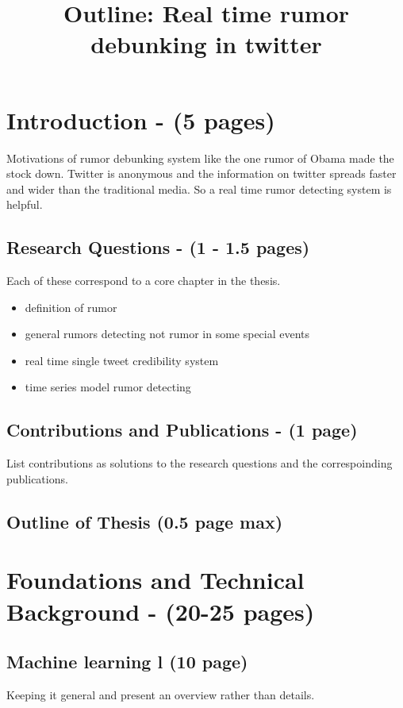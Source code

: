 \documentclass[12pt]{article}
\begin{document}
\title{Outline: Real time rumor debunking in twitter	}
\maketitle

\section{Introduction - (5 pages)}
	Motivations of rumor debunking system like the one rumor of Obama made the stock down. Twitter is anonymous and the information on twitter spreads faster and wider than the traditional media. So a real time rumor detecting system is helpful. 

	\subsection{Research Questions - (1 - 1.5 pages)}
	Each of these correspond to a core chapter in the thesis.
		\begin{itemize}
			\item{definition of rumor}

			\item{general rumors detecting not rumor in some special events}
			\item{real time single tweet credibility system}
			\item{time series model rumor detecting}
		\end{itemize}
	\subsection{Contributions and Publications - (1 page)}
		List contributions as solutions to the research questions and the correspoinding publications.
	\subsection{Outline of Thesis (0.5 page max)} 

\newpage
\section{Foundations and Technical Background - (20-25 pages)}
	
	\subsection{Machine learning l (10 page)} 
		Keeping it general and present an overview rather than details.
\end{document}
